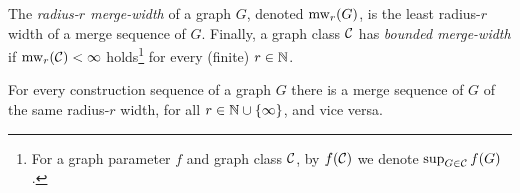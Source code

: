 \begin{definition}
  The \emph{radius-$r$ merge-width} of a graph $G$, denoted $\operatorname{mw}_r(G)$, is the least radius-$r$ width of a merge sequence of $G$.
Finally, a graph class $\mathcal C$ has \emph{bounded merge-width}
  if ${\operatorname{mw}_r(\mathcal C)<\infty}$ holds\footnote{For a graph parameter $f$ and graph class $\mathcal C$, by $f(\mathcal C)$ we denote $\sup_{G\in\mathcal C}f(G)$.} for every (finite) $r\in\mathbb N$.
\end{definition}

\begin{lemma}\label{lem:fmw}
    For every construction sequence of a graph $G$ there is a merge sequence of $G$
  of the same radius-$r$ width, for all $r\in\mathbb N\cup\{\infty\}$,
  and vice versa.
  \end{lemma}
